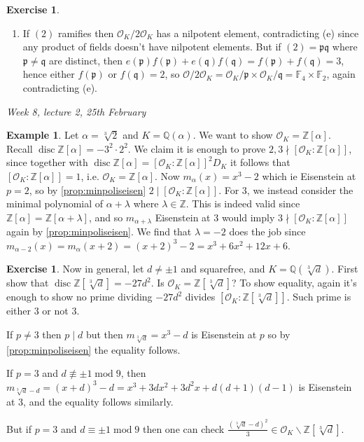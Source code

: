 \documentclass{article}
\newcommand{\Z}{\mathbb{Z}}
\newcommand{\Q}{\mathbb{Q}}
\newcommand{\F}{\mathbb{F}}
\newcommand{\Mod}{\operatorname{mod}}
\newcommand{\disc}{\operatorname{disc}}
\newcommand{\ri}{\mathcal{O}}
\newcommand{\ip}{\mathfrak{p}}
\newcommand{\iq}{\mathfrak{q}}
\theoremstyle{definition}
\newtheorem{example}[defn]{Example}
\newtheorem{exe}[defn]{Exercise}
\begin{document}
\begin{exe}
\begin{enumerate}
\begin{enumerate}
\item If $(2)$ ramifies then $\ri_K/2\ri_K$ has a nilpotent element, contradicting (e) since any product of fields doesn't have nilpotent elements. But if $(2)=\ip\iq$ where $\ip\neq\iq$ are distinct, then $e(\ip)f(\ip)+e(\iq)f(\iq)=f(\ip)+f(\iq)=3$, hence either $f(\ip)$ or $f(\iq)=2$, so $\ri/2\ri_K=\ri_K/\ip\times\ri_K/\iq=\F_4\times\F_2$, again contradicting (e).
\end{enumerate}
\end{enumerate}
\end{exe}

\begin{flushright}
\textit{Week 8, lecture 2, 25th February}
\end{flushright}

\begin{example}
Let $\alpha=\sqrt[3]2$ and $K=\Q(\alpha)$. We want to show $\ri_K=\Z[\alpha]$. Recall $\disc \Z[\alpha]=-3^2\cdot 2^2$. We claim it is enough to prove $2,3\nmid [\ri_K:\Z[\alpha]]$, since together with $\disc\Z[\alpha]=[\ri_K:\Z[\alpha]]^2 D_K$ it follows that $[\ri_K:\Z[\alpha]]=1$, i.e. $\ri_K=\Z[\alpha]$.  Now $m_\alpha(x)=x^3-2$ which ie Eisenstein at $p=2$, so by \ref{prop:minpoliseisen} $2\mid [\ri_K:\Z[\alpha]]$. For 3, we instead consider the minimal polynomial of $\alpha+\lambda$ where $\lambda\in\Z$. This is indeed valid since $\Z[\alpha]=\Z[\alpha+\lambda]$, and so $m_{\alpha+\lambda}$ Eisenstein at 3 would imply $3\nmid [\ri_K:\Z[\alpha]]$ again by \ref{prop:minpoliseisen}. We find that $\lambda=-2$ does the job since $m_{\alpha-2}(x)=m_\alpha(x+2)=(x+2)^3-2=x^3+6x^2+12x+6$.
\end{example}

\begin{exe}
Now in general, let $d\neq\pm 1$ and squarefree, and $K=\Q\left(\sqrt[3]d\right)$. First show that $\disc \Z\left[\sqrt[3]d\right]=-27d^2$. Is $\ri_K=\Z\left[\sqrt[3]d\right]$? To show equality, again it's enough to show no prime dividing $-27d^2$ divides $\left[\ri_K:\Z\left[\sqrt[3]d\right]\right]$. Such prime is either 3 or not 3.

If $p\neq 3$ then $p\mid d$ but then $m_{\sqrt[3]d}=x^3-d$ is Eisenstein at $p$ so by \ref{prop:minpoliseisen} the equality follows.

If $p=3$ and $d\nequiv\pm 1\Mod 9$, then $m_{\sqrt[3]d-d}=(x+d)^3-d=x^3+3dx^2+3d^2x+d(d+1)(d-1)$ is Eisenstein at 3, and the equality follows similarly.

But if $p=3$ and $d\equiv\pm 1\Mod 9$ then one can check $\frac{\left(\sqrt[3]d-d\right)^2}{3}\in\ri_K\backslash\Z\left[\sqrt[3]d\right]$.
\end{exe}
\end{document}
